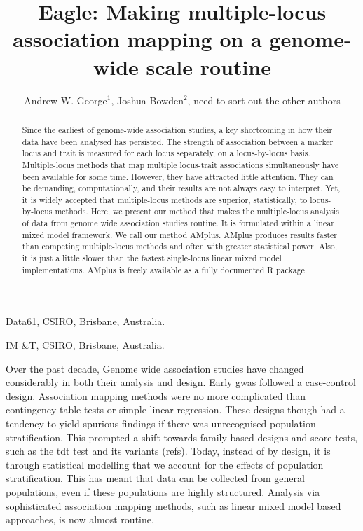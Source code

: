 \documentclass{nature}
\begin{document}
\title{Eagle: Making multiple-locus association mapping on a genome-wide scale routine}
\author{Andrew W. George$^1$, Joshua Bowden$^2$, need to sort out the other authors}

\maketitle


\begin{affiliations}
\item Data61, CSIRO, Brisbane, Australia.
\item IM \&T, CSIRO, Brisbane, Australia.
\end{affiliations}

\begin{abstract}
Since the earliest of genome-wide association studies, a key shortcoming in how their data have been analysed has persisted. The strength of association between a marker locus and trait is measured for each locus separately, on a locus-by-locus basis. Multiple-locus methods that map multiple locus-trait associations simultaneously have been available for some time. However, they have attracted little attention. They can be demanding, computationally, and their results are not always easy to interpret. Yet, it is widely accepted that multiple-locus methods are superior, statistically, to locus-by-locus methods. Here, we present our method that makes the multiple-locus analysis of data from genome wide association studies routine. It is formulated within a linear mixed model framework. 
We call our method AMplus.  AMplus produces results faster than competing multiple-locus methods and often with greater statistical power. Also, it is just a little slower than the fastest single-locus linear mixed model implementations. 
AMplus is freely available as a fully documented R package. 
\end{abstract}





Over the past decade,  Genome wide association studies have changed considerably in both their analysis and design. Early gwas followed a case-control design. Association mapping methods were no more complicated than contingency table tests or simple 
linear regression. These designs though had a tendency to yield spurious findings if there was unrecognised population stratification. This prompted a shift towards family-based designs and score tests, such as the tdt test and its variants (refs). Today, instead of by design, it is through statistical modelling that we account for the effects of population stratification. This has meant that data can be collected from general populations, even if these populations are highly structured. Analysis via sophisticated association mapping methods, such as linear mixed model based approaches,  is now almost routine.
\end{document}
